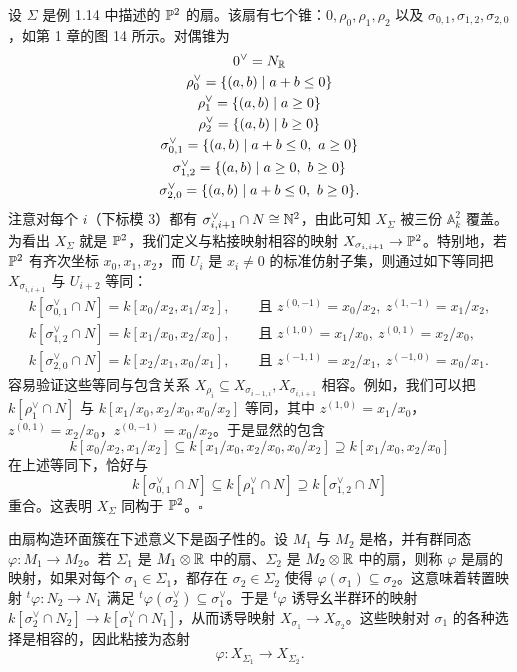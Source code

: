 \begin{example}
设 $\Sigma$ 是例 1.14 中描述的 $\mathbb{P}^2$ 的扇。该扇有七个锥：$0,\rho_0,\rho_1,\rho_2$ 以及 $\sigma_{0,1},\sigma_{1,2},\sigma_{2,0}$，如第 1 章的图 14 所示。对偶锥为
\begin{gather*}
0^{\vee}=N_{\mathbb{R}}\\
\rho_0^{\vee}=\{(a,b)\mid a+b\le 0\}\\
\rho_1^{\vee}=\{(a,b)\mid a\ge 0\}\\
\rho_2^{\vee}=\{(a,b)\mid b\ge 0\}\\
\sigma_{0,1}^{\vee}=\{(a,b)\mid a+b\le 0,\ a\ge 0\}\\
\sigma_{1,2}^{\vee}=\{(a,b)\mid a\ge 0,\ b\ge 0\}\\
\sigma_{2,0}^{\vee}=\{(a,b)\mid a+b\le 0,\ b\ge 0\}.
\end{gather*}
注意对每个 $i$（下标模 $3$）都有 $\sigma_{i,i+1}^{\vee}\cap N\cong\mathbb{N}^2$，由此可知 $X_\Sigma$ 被三份 $\mathbb{A}^2_k$ 覆盖。为看出 $X_\Sigma$ 就是 $\mathbb{P}^2$，我们定义与粘接映射相容的映射 $X_{\sigma_{i,i+1}}\to\mathbb{P}^2$。特别地，若 $\mathbb{P}^2$ 有齐次坐标 $x_0,x_1,x_2$，而 $U_i$ 是 $x_i\ne 0$ 的标准仿射子集，则通过如下等同把 $X_{\sigma_{i,i+1}}$ 与 $U_{i+2}$ 等同：
\begin{gather*}
k[\sigma_{0,1}^{\vee}\cap N]=k[x_0/x_2,x_1/x_2],\qquad \text{且 } z^{(0,-1)}=x_0/x_2,\ z^{(1,-1)}=x_1/x_2,\\
k[\sigma_{1,2}^{\vee}\cap N]=k[x_1/x_0,x_2/x_0],\qquad \text{且 } z^{(1,0)}=x_1/x_0,\ z^{(0,1)}=x_2/x_0,\\
k[\sigma_{2,0}^{\vee}\cap N]=k[x_2/x_1,x_0/x_1],\qquad \text{且 } z^{(-1,1)}=x_2/x_1,\ z^{(-1,0)}=x_0/x_1.
\end{gather*}
容易验证这些等同与包含关系 $X_{\rho_i}\subseteq X_{\sigma_{i-1,i}},X_{\sigma_{i,i+1}}$ 相容。例如，我们可以把 $k[\rho_1^{\vee}\cap N]$ 与 $k[x_1/x_0,x_2/x_0,x_0/x_2]$ 等同，其中 $z^{(1,0)}=x_1/x_0$，$z^{(0,1)}=x_2/x_0$，$z^{(0,-1)}=x_0/x_2$。于是显然的包含
\[
  k[x_0/x_2,x_1/x_2]\subseteq k[x_1/x_0,x_2/x_0,x_0/x_2]\supseteq k[x_1/x_0,x_2/x_0]
\]
在上述等同下，恰好与
\[
  k[\sigma_{0,1}^{\vee}\cap N]\subseteq k[\rho_1^{\vee}\cap N]\supseteq k[\sigma_{1,2}^{\vee}\cap N]
\]
重合。这表明 $X_\Sigma$ 同构于 $\mathbb{P}^2$。\hfill$\square$
\end{example}

由扇构造环面簇在下述意义下是函子性的。设 $M_1$ 与 $M_2$ 是格，并有群同态 $\varphi:M_1\to M_2$。若 $\Sigma_1$ 是 $M_1\otimes\mathbb{R}$ 中的扇、$\Sigma_2$ 是 $M_2\otimes\mathbb{R}$ 中的扇，则称 $\varphi$ 是扇的映射，如果对每个 $\sigma_1\in\Sigma_1$，都存在 $\sigma_2\in\Sigma_2$ 使得 $\varphi(\sigma_1)\subseteq\sigma_2$。这意味着转置映射 ${}^t\varphi:N_2\to N_1$ 满足 ${}^t\varphi(\sigma_2^{\vee})\subseteq\sigma_1^{\vee}$。于是 ${}^t\varphi$ 诱导幺半群环的映射 $k[\sigma_2^{\vee}\cap N_2]\to k[\sigma_1^{\vee}\cap N_1]$，从而诱导映射 $X_{\sigma_1}\to X_{\sigma_2}$。这些映射对 $\sigma_1$ 的各种选择是相容的，因此粘接为态射
\[
  \varphi:X_{\Sigma_1}\to X_{\Sigma_2}.
\]

